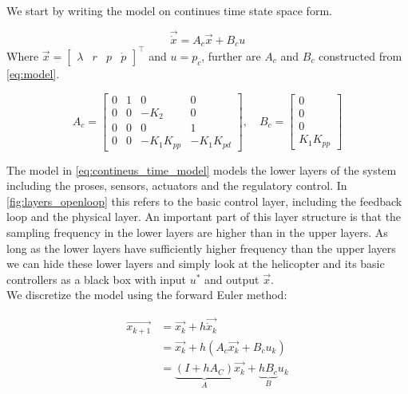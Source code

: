 \documentclass[11pt, a4paper, USenglish]{article} %
\begin{document}
We start by writing the model on continues time state space form.

\begin{equation}\label{eq:contineus_time_model}
    \vec{\dot{x}} = A_c\vec{x} + B_c u 
\end{equation}
Where $\vec{x}=\begin{bmatrix} \lambda&r&p&\dot{p} \end{bmatrix}^\top$ and $u=p_c$, further are $A_c$ and $B_c$ constructed from \cref{eq:model}. 

\begin{equation*}
A_c =
    \begin{bmatrix}
        0 &  1 &  0 & 0 \\
        0 &  0 &  -K_2 & 0  \\
        0 &  0 &  0 & 1 \\
        0 &  0 & -K_1K_{pp} & -K_1K_{pd}                                 
    \end{bmatrix}
    , \quad B_c = 
    \begin{bmatrix} 0 \\ 0 \\ 0 \\ K_1K_{pp} \end{bmatrix}
\end{equation*}

The model in \cref{eq:contineus_time_model} models the lower layers of the system including the proses, sensors, actuators and the regulatory control. In \cref{fig:layers_openloop} this refers to the basic control layer, including the feedback loop and the physical layer. An important part of this layer structure is that the sampling frequency in the lower layers are higher than in the upper layers. As long as the lower layers have sufficiently higher frequency than the upper layers we can hide these lower layers and simply look at the helicopter and its basic controllers as a black box with input $u^*$ and output $\vec{x}$.\\

We discretize the model using the forward Euler method:

\begin{align*}
    \vec{x_{k+1}} &= \vec{x_k} + h\vec{\dot{x}_k} \\
                  &= \vec{x_k} + h(A_c\vec{x_k} + B_c u_k) \\
                  &= \underbrace{(I + hA_C)}_{A}\vec{x_k} + \underbrace{hB_c}_{B} u_k \\
\end{align*}
\end{document}
